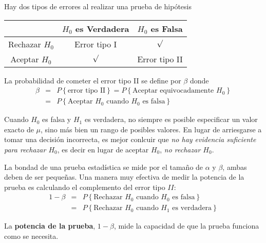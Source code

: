 Hay dos tipos de errores al realizar una prueba de hip\'otesis
\begin{center}
\begin{tabular}{c|cc}
& $H_{0}$ es Verdadera & $H_{0}$ es Falsa\\\hline\hline
Rechazar $H_{0}$ & Error tipo I & $\surd$\\
Aceptar $H_{0}$ & $\surd$ & Error tipo II
\end{tabular}
\end{center}
\begin{Def}
La probabilidad de cometer el error tipo II se define por $\beta$ donde
\begin{eqnarray*}
\beta&=&P\left\{\textrm{error tipo II}\right\}=P\left\{\textrm{Aceptar equivocadamente }H_{0}\right\}\\
&=&P\left\{\textrm{Aceptar }H_{0}\textrm{ cuando }H_{0}\textrm{ es falsa}\right\}
\end{eqnarray*}
\end{Def}

\begin{Note}
Cuando $H_{0}$ es falsa y $H_{1}$ es verdadera, no siempre es posible especificar un valor exacto de $\mu$, sino m\'as bien un rango de posibles valores.\medskip
En lugar de arriesgarse a tomar una decisi\'on incorrecta, es mejor conlcuir que \textit{no hay evidencia suficiente para rechazar $H_{0}$}, es decir en lugar de aceptar $H_{0}$, \textit{no rechazar $H_{0}$}.

\end{Note}
La bondad de una prueba estad\'istica se mide por el tama\~ no de $\alpha$ y $\beta$, ambas deben de ser peque\~ nas. Una manera muy efectiva de medir la potencia de la prueba es calculando el complemento del error tipo $II$:
\begin{eqnarray*}
1-\beta&= &P\left\{\textrm{Rechazar }H_{0}\textrm{ cuando }H_{0}\textrm{ es falsa}\right\}\\
&=&P\left\{\textrm{Rechazar }H_{0}\textrm{ cuando }H_{1}\textrm{ es verdadera}\right\}
\end{eqnarray*}
\begin{Def}
La \textbf{potencia de la prueba}, $1-\beta$, mide la capacidad de que la prueba funciona como se necesita.
\end{Def}


